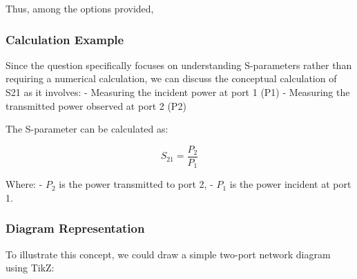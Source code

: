 Thus, among the options provided, 

\subsubsection*{Calculation Example}

Since the question specifically focuses on understanding S-parameters rather than requiring a numerical calculation, we can discuss the conceptual calculation of S21 as it involves:
- Measuring the incident power at port 1 (P1)
- Measuring the transmitted power observed at port 2 (P2)
  
The S-parameter can be calculated as:

\[
S_{21} = \frac{P_{2}}{P_{1}}
\]

Where:
- \(P_2\) is the power transmitted to port 2,
- \(P_1\) is the power incident at port 1.

\subsubsection*{Diagram Representation}

To illustrate this concept, we could draw a simple two-port network diagram using TikZ:

\begin{center}
\end{center}
